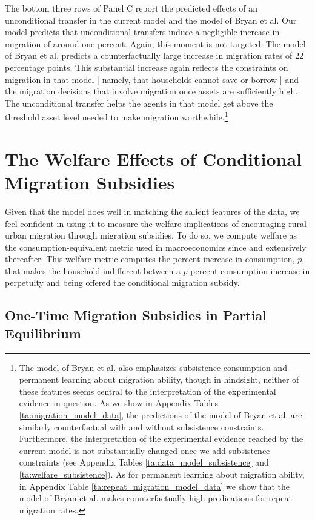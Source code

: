 \documentclass[12pt,pdftex]{article}
\begin{document}
The bottom three rows of Panel C report the predicted effects of an unconditional transfer in the current model and the model of Bryan et al.  Our model predicts that unconditional transfers induce a negligible increase in migration of around one percent. Again, this moment is not targeted. The model of Bryan et al. predicts a counterfactually large increase in migration rates of 22 percentage points. This substantial increase again reflects the constraints on migration in that model | namely, that households cannot save or borrow | and the migration decisions that involve migration once assets are sufficiently high. The unconditional transfer helps the agents in that model get above the threshold asset level needed to make migration worthwhile.\footnote{The model of Bryan et al. also emphasizes subsistence consumption and permanent learning about migration ability, though in hindsight, neither of these features seems central to the interpretation of the experimental evidence in question. As we show in Appendix Tables \ref{ta:migration_model_data}, the predictions of the model of Bryan et al. are similarly counterfactual with and without subsistence constraints. Furthermore, the interpretation of the experimental evidence reached by the current model is not substantially changed once we add subsistence constraints (see Appendix Tables \ref{ta:data_model_subsistence} and \ref{ta:welfare_subsistence}). As for permanent learning about migration ability, in Appendix Table \ref{ta:repeat_migration_model_data} we show that the model of Bryan et al. makes counterfactually high predications for repeat migration rates.}


\section{The Welfare Effects of Conditional Migration Subsidies\label{sec:welfare}}

Given that the model does well in matching the salient features of the data, we feel confident in using it to measure the welfare implications of encouraging rural-urban migration through migration subsidies. To do so, we compute welfare as the consumption-equivalent metric used in macroeconomics since \citet{luca85} and extensively thereafter. This welfare metric computes the percent increase in consumption, $p$, that makes the household indifferent between a $p$-percent consumption increase in perpetuity and being offered the conditional migration subsidy.

\subsection{One-Time Migration Subsidies in Partial Equilibrium}
\end{document}
